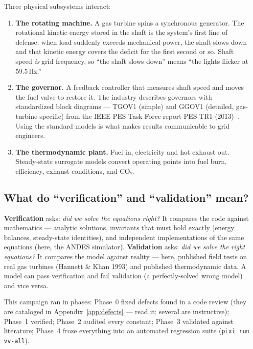 \documentclass[11pt]{article}
\begin{document}
Three physical subsystems interact:
\begin{enumerate}[nosep]
  \item \textbf{The rotating machine.} A gas turbine spins a synchronous
    generator. The rotational kinetic energy stored in the shaft is the
    system's first line of defense: when load suddenly exceeds mechanical
    power, the shaft slows down and that kinetic energy covers the deficit
    for the first second or so. Shaft speed \emph{is} grid frequency, so
    ``the shaft slows down'' means ``the lights flicker at 59.5\,Hz.''
  \item \textbf{The governor.} A feedback controller that measures shaft
    speed and moves the fuel valve to restore it. The industry describes
    governors with standardized block diagrams --- \textsc{TGOV1} (simple)
    and \textsc{GGOV1} (detailed, gas-turbine-specific) from the IEEE PES
    Task Force report PES-TR1 (2013)~\cite{pestr1}. Using the standard
    models is what makes results communicable to grid engineers.
  \item \textbf{The thermodynamic plant.} Fuel in, electricity and hot
    exhaust out. Steady-state surrogate models convert operating points
    into fuel burn, efficiency, exhaust conditions, and CO$_2$.
\end{enumerate}

\subsection{What do ``verification'' and ``validation'' mean?}

\begin{novicebox}[V vs.\ V]
\textbf{Verification} asks: \emph{did we solve the equations right?} It
compares the code against mathematics --- analytic solutions, invariants
that must hold exactly (energy balances, steady-state identities), and
independent implementations of the same equations (here, the ANDES
simulator). \textbf{Validation} asks: \emph{did we solve the right
equations?} It compares the model against reality --- here, published field
tests on real gas turbines (Hannett \& Khan 1993) and published
thermodynamic data. A model can pass verification and fail validation (a
perfectly-solved wrong model) and vice versa.
\end{novicebox}

This campaign ran in phases: Phase~0 fixed defects found in a code review
(they are cataloged in Appendix~\ref{app:defects} --- read it; several are
instructive); Phase~1 verified; Phase~2 audited every constant; Phase~3
validated against literature; Phase~4 froze everything into an automated
regression suite (\texttt{pixi run vv-all}).
\end{document}
